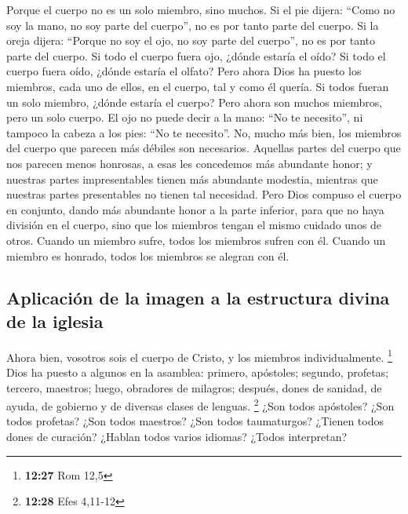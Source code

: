  Porque el cuerpo no es un solo miembro, sino muchos.
 Si el pie dijera: ``Como no soy la mano, no soy parte
del cuerpo'', no es por tanto parte del cuerpo.  Si la
oreja dijera: ``Porque no soy el ojo, no soy parte del cuerpo'', no es
por tanto parte del cuerpo.  Si todo el cuerpo fuera ojo,
¿dónde estaría el oído? Si todo el cuerpo fuera oído, ¿dónde estaría el
olfato?  Pero ahora Dios ha puesto los miembros, cada uno
de ellos, en el cuerpo, tal y como él quería.  Si todos
fueran un solo miembro, ¿dónde estaría el cuerpo?  Pero
ahora son muchos miembros, pero un solo cuerpo.  El ojo
no puede decir a la mano: ``No te necesito'', ni tampoco la cabeza a los
pies: ``No te necesito''.  No, mucho más bien, los
miembros del cuerpo que parecen más débiles son necesarios.
 Aquellas partes del cuerpo que nos parecen menos
honrosas, a esas les concedemos más abundante honor; y nuestras partes
impresentables tienen más abundante modestia,  mientras
que nuestras partes presentables no tienen tal necesidad. Pero Dios
compuso el cuerpo en conjunto, dando más abundante honor a la parte
inferior,  para que no haya división en el cuerpo, sino
que los miembros tengan el mismo cuidado unos de otros. 
Cuando un miembro sufre, todos los miembros sufren con él. Cuando un
miembro es honrado, todos los miembros se alegran con él.

\hypertarget{aplicaciuxf3n-de-la-imagen-a-la-estructura-divina-de-la-iglesia}{%
\subsection{Aplicación de la imagen a la estructura divina de la
iglesia}\label{aplicaciuxf3n-de-la-imagen-a-la-estructura-divina-de-la-iglesia}}

 Ahora bien, vosotros sois el cuerpo de Cristo, y los
miembros individualmente. \footnote{\textbf{12:27} Rom 12,5}
 Dios ha puesto a algunos en la asamblea: primero,
apóstoles; segundo, profetas; tercero, maestros; luego, obradores de
milagros; después, dones de sanidad, de ayuda, de gobierno y de diversas
clases de lenguas. \footnote{\textbf{12:28} Efes 4,11-12}
 ¿Son todos apóstoles? ¿Son todos profetas? ¿Son todos
maestros? ¿Son todos taumaturgos?  ¿Tienen todos dones de
curación? ¿Hablan todos varios idiomas? ¿Todos interpretan?

